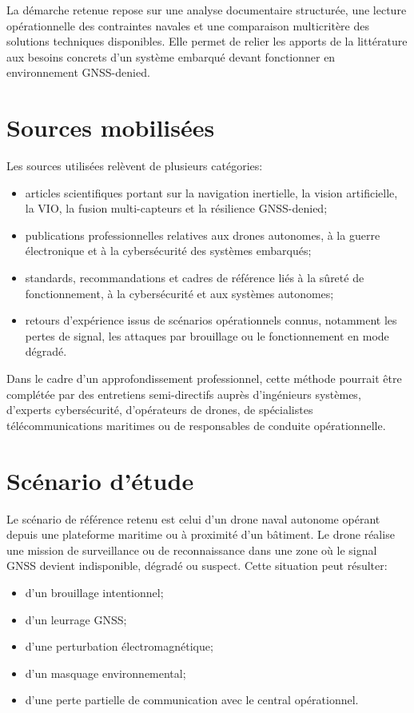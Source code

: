 \documentclass[12pt, a4paper, twoside, openright]{report}
\begin{document}
La démarche retenue repose sur une analyse documentaire structurée, une lecture opérationnelle des contraintes navales et une comparaison multicritère des solutions techniques disponibles. Elle permet de relier les apports de la littérature aux besoins concrets d’un système embarqué devant fonctionner en environnement GNSS-denied.

\section{Sources mobilisées}
Les sources utilisées relèvent de plusieurs catégories:
\begin{itemize}
    \item articles scientifiques portant sur la navigation inertielle, la vision artificielle, la VIO, la fusion multi-capteurs et la résilience GNSS-denied;
    \item publications professionnelles relatives aux drones autonomes, à la guerre électronique et à la cybersécurité des systèmes embarqués;
    \item standards, recommandations et cadres de référence liés à la sûreté de fonctionnement, à la cybersécurité et aux systèmes autonomes;
    \item retours d’expérience issus de scénarios opérationnels connus, notamment les pertes de signal, les attaques par brouillage ou le fonctionnement en mode dégradé.
\end{itemize}

Dans le cadre d’un approfondissement professionnel, cette méthode pourrait être complétée par des entretiens semi-directifs auprès d’ingénieurs systèmes, d’experts cybersécurité, d’opérateurs de drones, de spécialistes télécommunications maritimes ou de responsables de conduite opérationnelle.

\section{Scénario d’étude}
Le scénario de référence retenu est celui d’un drone naval autonome opérant depuis une plateforme maritime ou à proximité d’un bâtiment. Le drone réalise une mission de surveillance ou de reconnaissance dans une zone où le signal GNSS devient indisponible, dégradé ou suspect. Cette situation peut résulter:
\begin{itemize}
    \item d’un brouillage intentionnel;
    \item d’un leurrage GNSS;
    \item d’une perturbation électromagnétique;
    \item d’un masquage environnemental;
    \item d’une perte partielle de communication avec le central opérationnel.
\end{itemize}
\end{document}
